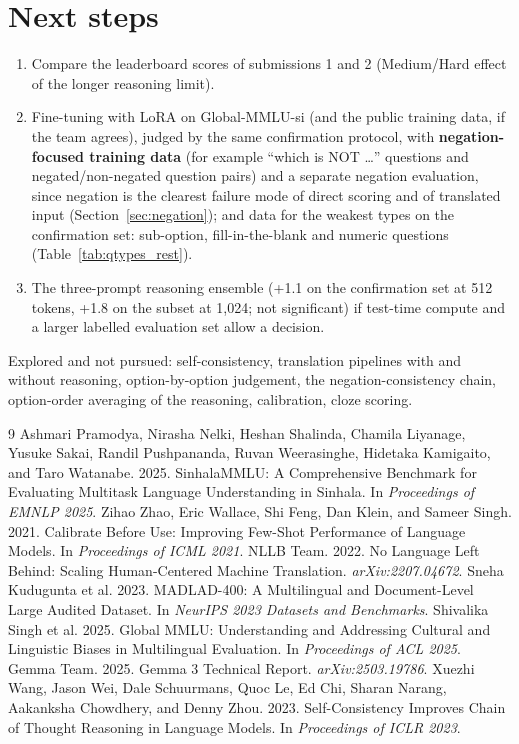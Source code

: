 \documentclass[10pt,a4paper]{article}
\begin{document}
\section{Next steps}
\begin{enumerate}
\item Compare the leaderboard scores of submissions 1 and 2 (Medium/Hard effect of the longer reasoning limit).
\item Fine-tuning with LoRA on Global-MMLU-si (and the public training data, if the team agrees), judged by the same
confirmation protocol, with \textbf{negation-focused training data} (for example ``which is NOT \ldots'' questions
and negated/non-negated question pairs) and a separate negation evaluation, since negation is the clearest failure
mode of direct scoring and of translated input (Section~\ref{sec:negation}); and data for the weakest types on the
confirmation set: sub-option, fill-in-the-blank and numeric questions (Table~\ref{tab:qtypes_rest}).
\item The three-prompt reasoning ensemble (+1.1 on the confirmation set at 512 tokens, +1.8 on the subset at 1,024;
not significant) if test-time compute and a larger labelled evaluation set allow a decision.
\end{enumerate}
Explored and not pursued: self-consistency, translation pipelines with and without reasoning, option-by-option
judgement, the negation-consistency chain, option-order averaging of the reasoning, calibration, cloze scoring.

\begin{thebibliography}{9}
 Ashmari Pramodya, Nirasha Nelki, Heshan Shalinda, Chamila Liyanage, Yusuke Sakai, Randil
Pushpananda, Ruvan Weerasinghe, Hidetaka Kamigaito, and Taro Watanabe. 2025. SinhalaMMLU: A Comprehensive Benchmark
for Evaluating Multitask Language Understanding in Sinhala. In \emph{Proceedings of EMNLP 2025}.
 Zihao Zhao, Eric Wallace, Shi Feng, Dan Klein, and Sameer Singh. 2021. Calibrate Before Use:
Improving Few-Shot Performance of Language Models. In \emph{Proceedings of ICML 2021}.
 NLLB Team. 2022. No Language Left Behind: Scaling Human-Centered Machine Translation.
\emph{arXiv:2207.04672}.
 Sneha Kudugunta et al. 2023. MADLAD-400: A Multilingual and Document-Level Large Audited Dataset.
In \emph{NeurIPS 2023 Datasets and Benchmarks}.
 Shivalika Singh et al. 2025. Global MMLU: Understanding and Addressing Cultural and Linguistic
Biases in Multilingual Evaluation. In \emph{Proceedings of ACL 2025}.
 Gemma Team. 2025. Gemma 3 Technical Report. \emph{arXiv:2503.19786}.
 Xuezhi Wang, Jason Wei, Dale Schuurmans, Quoc Le, Ed Chi, Sharan Narang, Aakanksha Chowdhery, and
Denny Zhou. 2023. Self-Consistency Improves Chain of Thought Reasoning in Language Models. In \emph{Proceedings of
ICLR 2023}.
\end{thebibliography}
\end{document}
